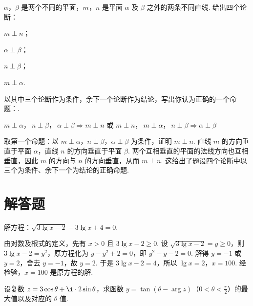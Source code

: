 \documentclass[UTF8,a4paper,oneside,11pt]{ctexbook}
\begin{document}
\begin{problem}
\(\alpha\)，\(\beta\) 是两个不同的平面，\(m\)，\(n\) 是平面 \(\alpha\) 及 \(\beta\) 之外的两条不同直线. 给出四个论断：

\begin{circlelist}
\item \(m\perp n\)；
\item \(\alpha\perp\beta\)；
\item \(n\perp\beta\)；
\item \(m\perp\alpha\).
\end{circlelist}

以其中三个论断作为条件，余下一个论断作为结论，写出你认为正确的一个命题：\fillinblank{}.
\end{problem}

\begin{answer}
\(m\perp\alpha\)，\(\ n\perp\beta\)，\(\ \alpha\perp\beta\Rightarrow m\perp n\) 或 \(m\perp n\)，\(\ m\perp\alpha\)，\(\ n\perp\beta\Rightarrow \alpha\perp\beta\)
\end{answer}

\begin{solution}
取第一个命题：以 \(m\perp\alpha\)，\(n\perp\beta\)，\(\alpha\perp\beta\) 为条件，证明 \(m\perp n\). 直线 \(m\) 的方向垂直于平面 \(\alpha\)，直线 \(n\) 的方向垂直于平面 \(\beta\). 两个互相垂直的平面的法线方向也互相垂直，因此 \(m\) 的方向与 \(n\) 的方向垂直，从而
\(m\perp n\). 这给出了题设四个论断中以三个为条件、余下一个为结论的正确命题.
\end{solution}

\section{解答题}

\begin{problem}
解方程：\(\sqrt{3\lg x-2}-3\lg x+4=0\).
\end{problem}

\begin{solution}
由对数及根式的定义，先有 \(x>0\) 且 \(3\lg x-2\ge0\). 设 \(\sqrt{3\lg x-2}=y\ge 0\)，则 \(3\lg x-2=y^2\)，原方程化为 \(y-y^2+2=0\)，即 \(y^2-y-2=0\). 解得 \(y=-1\) 或 \(y=2\)，舍去 \(y=-1\)，故 \(y=2\).
于是 \(3\lg x-2=4\)，所以 \(\lg x=2\)，\(x=100\). 经检验，\(x=100\) 是原方程的解.
\end{solution}

\begin{problem}
设复数 \(z=3\cos\theta+\i\cdot 2\sin\theta\)，求函数 \(y=\tan(\theta-\arg z)\)（\(0<\theta<\frac{\pi}{2}\)）的最大值以及对应的 \(\theta\) 值.
\end{problem}
\end{document}
